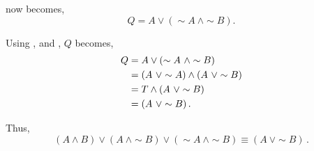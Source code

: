 \begin{subquestions}
 now becomes,
\begin{equation}
	Q = A \lor (\sim A ~\land \sim B).
\end{equation}

Using ,  and , $Q$ becomes,
\begin{align}
	Q & = A \lor (\sim A ~\land \sim B) \nonumber \\
	  & = (A ~\lor \sim A) \land (A ~\lor \sim B) \nonumber \\
	  & = T \land (A ~\lor \sim B) \nonumber \\
	  & = (A ~\lor \sim B) \,. 
\end{align}

Thus,
\begin{equation}
	(A \land B) \lor (A ~\land \sim B) \lor (\sim A ~\land \sim B) \equiv (A ~\lor \sim B) \,.
\end{equation}

\end{subquestions}